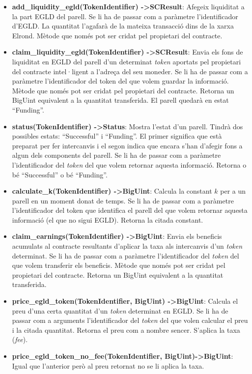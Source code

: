 \documentclass[11pt,a4paper]{article}
\begin{document}
\begin{itemize}
\item \textbf{add\_liquidity\_egld(TokenIdentifier)  -\textgreater SCResult}: Afegeix liquiditat a la part EGLD del parell. Se li ha de passar com a paràmetre l'identificador d'EGLD. La quantitat l'agafarà de la mateixa transacció dins de la xarxa Elrond. Mètode que només pot ser cridat pel propietari del contracte.
\item \textbf{claim\_liquidity\_egld(TokenIdentifier)  -\textgreater SCResult}: Envia els fons de liquiditat en EGLD del parell d'un determinat \textit{token} aportats pel propietari del contracte intel·ligent a l'adreça del seu moneder. Se li ha de passar com a paràmetre l'identificador del token del que volem guardar la informació. Mètode que només pot ser cridat pel propietari del contracte. Retorna un BigUint equivalent a la quantitat transferida. El parell quedarà en estat ``Funding''.
\item \textbf{status(TokenIdentifier) -\textgreater Status}: Mostra l'estat d'un parell. Tindrà dos possibles estats: ``Successful'' i ``Funding''. El primer significa que està preparat per fer intercanvis i el segon indica que encara s'han d'afegir fons a algun dels components del parell. Se li ha de passar com a paràmetre l'identificador del \textit{token} del que volem retornar aquesta informació. Retorna o bé ``Successful'' o bé ``Funding''.
\item \textbf{calculate\_k(TokenIdentifier) -\textgreater BigUint}: Calcula la constant \(k\) per a un parell en un moment donat de temps. Se li ha de passar com a paràmetre l'identificador del token que identifica el parell del que volem retornar aquesta informació (el que no sigui EGLD). Retorna la citada constant.
\item \textbf{claim\_earnings(TokenIdentifier) -\textgreater BigUint}: Envia els beneficis acumulats al contracte resultants d'aplicar la taxa als intercanvis d'un \textit{token} determinat. Se li ha de passar com a paràmetre l'identificador del \textit{token} del que volem transferir els beneficis. Mètode que només pot ser cridat pel propietari del contracte. Retorna un BigUint equivalent a la quantitat transferida.
\item \textbf{price\_egld\_token(TokenIdentifier, BigUint) -\textgreater BigUint}: Calcula el preu d'una certa quantitat d'un \textit{token} determinat en EGLD. Se li ha de passar com a arguments l'identificador del \textit{token} del que volen calcular el preu i la citada quantitat. Retorna el preu com a nombre sencer. S'aplica la taxa (\textit{fee}).
\item \textbf{price\_egld\_token\_no\_fee(TokenIdentifier, BigUint)-\textgreater BigUint}: Igual que l'anterior però al preu retornat no se li aplica la taxa.

\end{itemize}
\end{document}
